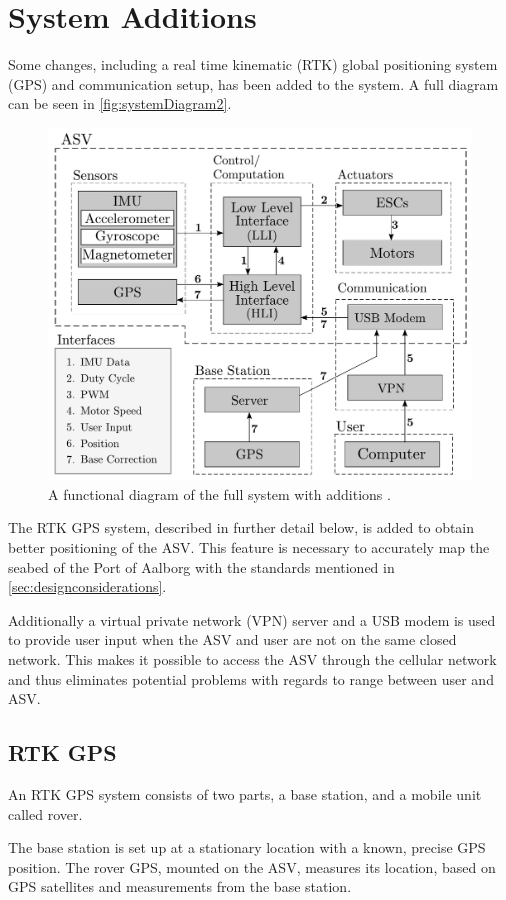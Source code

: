\section{System Additions}
Some changes, including a real time kinematic (RTK) global positioning system (GPS) and communication setup, has been added to the system. A full diagram can be seen in \autoref{fig:systemDiagram2}.
%
\begin{figure}[H]
  \includegraphics[width=.65\textwidth]{figures/systemDiagram5}
  \caption{A functional diagram of the full system with additions .}
  \label{fig:systemDiagram2}
\end{figure}
%
The RTK GPS system, described in further detail below, is added to obtain better positioning of the ASV. This feature is necessary to accurately map the seabed of the Port of Aalborg with the standards mentioned in \autoref{sec:designconsiderations}.

Additionally a virtual private network (VPN) server and a USB modem is used to provide user input when the ASV and user are not on the same closed network. This makes it possible to access the ASV through the cellular network and thus eliminates potential problems with regards to range between user and ASV.

\subsection{RTK GPS}
An RTK GPS system consists of two parts, a base station, and a  mobile unit called rover.

The base station is set up at a stationary location with a known, precise GPS position. The rover GPS, mounted on the ASV, measures its location, based on GPS satellites and measurements from the base station. \cite{EmlidRTK}

